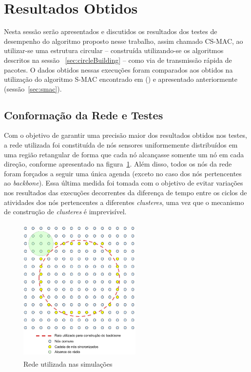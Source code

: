 \section{Resultados Obtidos}

Nesta sessão serão apresentados e discutidos os resultados dos testes de desempenho do algoritmo proposto nesse trabalho, assim chamado CS-MAC, ao utilizar-se uma estrutura circular -- construída utilizando-se os algoritmos descritos na sessão ~\ref{sec:circleBuilding} -- como via de transmissão rápida de pacotes. O dados obtidos nessas execuções foram comparados aos obtidos na utilização do algoritmo S-MAC encontrado em  (\citeyear{ye04}) e apresentado anteriormente (sessão~\ref{sec:smac}).

\subsection{Conformação da Rede e Testes}

Com o objetivo de garantir uma precisão maior dos resultados obtidos nos testes, a rede utilizada foi constituída de nós sensores uniformemente distribuídos em uma região retangular de forma que cada nó alcançasse somente um nó em cada direção, conforme apresentado na figura~\ref{fig:simulationNetwork}. Além disso, todos os nós da rede foram forçados a seguir uma única agenda (exceto no caso dos nós pertencentes ao \emph{backbone}). Essa última medida foi tomada com o objetivo de evitar variações nos resultados das execuções decorrentes da diferença de tempo entre os ciclos de atividades dos nós pertencentes a diferentes \emph{clusteres}, uma vez que o mecanismo de construção de \emph{clusteres} é imprevisível.

\begin{figure}[!htb]
\centering
\includegraphics[width=230px,height=275px]{./Pictures/SimulationNetwork.png}
\caption{Rede utilizada nas simulações} %
\label{fig:simulationNetwork} %
\end{figure}

